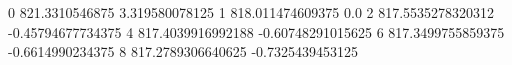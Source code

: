 0 821.3310546875 3.319580078125
1 818.011474609375 0.0
2 817.5535278320312 -0.45794677734375
4 817.4039916992188 -0.60748291015625
6 817.3499755859375 -0.6614990234375
8 817.2789306640625 -0.7325439453125
